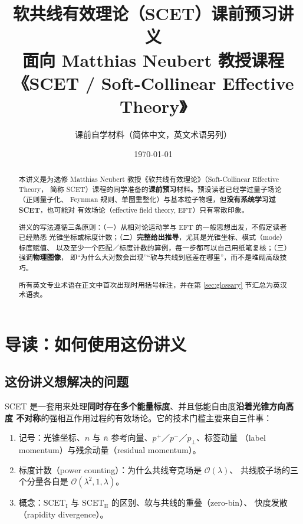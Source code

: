 \documentclass[UTF8,a4paper,11pt]{ctexart}
\title{\bfseries 软共线有效理论（SCET）课前预习讲义\\[8pt]
       \large 面向 Matthias Neubert 教授课程
       《SCET / Soft-Collinear Effective Theory》}
\author{课前自学材料（简体中文，英文术语另列）}
\date{\today}
\theoremstyle{definition}
\theoremstyle{remark}
\theoremstyle{plain}
\newcommand{\SCETI}{\text{SCET}_{\mathrm{I}}}
\newcommand{\SCETII}{\text{SCET}_{\mathrm{II}}}
\newcommand{\en}[1]{\textsf{#1}}   %
\begin{document}
\maketitle

\begin{abstract}
\noindent
本讲义是为选修 Matthias Neubert 教授《软共线有效理论》（\en{Soft-Collinear Effective Theory}，
简称 SCET）课程的同学准备的\textbf{课前预习}材料。预设读者已经学过量子场论（正则量子化、
Feynman 规则、单圈重整化）与基本粒子物理，但\textbf{没有系统学习过 SCET}，也可能对
有效场论（\en{effective field theory}, EFT）只有零散印象。

讲义的写法遵循三条原则：（一）从相对论运动学与 EFT 的一般思想出发，不假定读者已经熟悉
光锥坐标或标度计数；（二）\textbf{完整给出推导}，尤其是光锥坐标、模式（\en{mode}）标度赋值、
以及至少一个匹配／标度计数的算例，每一步都可以自己用纸笔复核；（三）强调\textbf{物理图像}，
即“为什么大对数会出现”“软与共线到底差在哪里”，而不是堆砌高级技巧。

所有英文专业术语在正文中首次出现时用括号标注，并在第 \ref{sec:glossary} 节汇总为英汉术语表。
\end{abstract}

\vspace{0.4em}
\tableofcontents
\vspace{1.2em}

\section*{导读：如何使用这份讲义}
\label{sec:guide}

\subsection*{这份讲义想解决的问题}

SCET 是一套用来处理\textbf{同时存在多个能量标度}、并且低能自由度\textbf{沿着光锥方向高度
不对称}的强相互作用过程的有效场论。它的技术门槛主要来自三件事：

\begin{enumerate}[label=(\arabic*)]
  \item 记号：光锥坐标、$n$ 与 $\bar n$ 参考向量、$p^+$／$p^-$／$p_\perp$、标签动量
        （\en{label momentum}）与残余动量（\en{residual momentum}）。
  \item 标度计数（\en{power counting}）：为什么共线夸克场是 $\mathcal O(\lambda)$、
        共线胶子场的三个分量各自是 $\mathcal O(\lambda^2,1,\lambda)$。
  \item 概念：$\SCETI$ 与 $\SCETII$ 的区别、软与共线的重叠（\en{zero-bin}）、
        快度发散（\en{rapidity divergence}）。
\end{enumerate}
\end{document}
